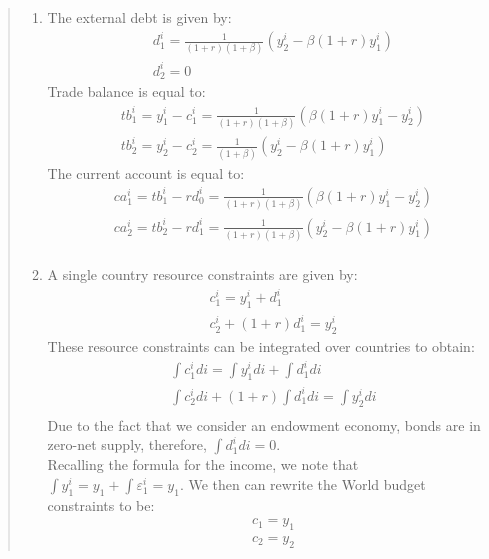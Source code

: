 \begin{exercise}
\begin{quote}
\begin{enumerate}
\item  The external debt is given by:
\begin{align*}
&d^i_1 = \frac{1}{(1+r)(1+\beta)}(y^i_2 - \beta(1+r)y^i_1)\\
& d^i_2 = 0
\end{align*}
Trade balance is equal to:
\begin{align*}
&tb^i_1 = y^i_1 - c^i_1 = \frac{1}{(1+r)(1+\beta)}(\beta(1+r)y^i_1 - y^i_2) \\
& tb^i_2 = y^i_2 - c^i_2 = \frac{1}{(1+\beta)}(y^i_2 - \beta(1+r)y^i_1)
\end{align*}
The current account is equal to:
\begin{align*}
&ca^i_1 =tb^i_1 - rd^i_{0} =  \frac{1}{(1+r)(1+\beta)}(\beta(1+r)y^i_1 - y^i_2) \\
&ca^i_2 =tb^i_2 - rd^i_{1} =  \frac{1}{(1+r)(1+\beta)}(y^i_2 - \beta(1+r)y^i_1)  \\
\end{align*}
\item 
A single country resource constraints are given by:
\begin{align*}
& c^i_1 = y^i_1 + d^i_1\\
& c^i_2 + (1+r)d^i_1 = y^i_2
\end{align*}
These resource constraints can be integrated over countries to obtain:
\begin{align*}
& \int c_1^idi = \int y_1^idi + \int d_1^idi \\
& \int c_2^idi + (1+r)\int d_1^i di= \int y_2^idi \\
\end{align*}
Due to the fact that we consider an endowment economy, bonds are in zero-net supply, therefore, $\int d_1^i di= 0$. 
\\ Recalling the formula for the income, we note that $\int y_1^i = y_1 + \int\varepsilon_1^i = y_1$. We then can rewrite the World budget constraints to be:
\begin{align*}
& c_1 =  y_1 \\
& c_2 = y_2
\end{align*}



\end{enumerate}
\end{quote}
\end{exercise}
